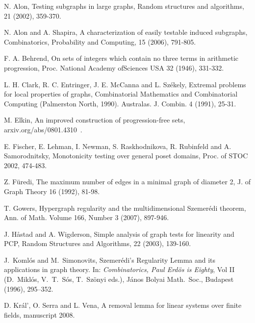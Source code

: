 \documentclass [letterpaper,11pt]{article}
\begin{document}

\begin{thebibliography}{99}

N. Alon, Testing subgraphs in large graphs, Random structures and
algorithms, 21 (2002), 359-370.

N. Alon and A. Shapira, A characterization of easily testable
induced subgraphs, Combinatorics, Probability and Computing, 15
(2006), 791-805.

F. A. Behrend, On sets of integers which contain no three terms in
arithmetic progression, Proc. National Academy ofSciences USA 32
(1946), 331-332.

L. H. Clark, R. C. Entringer, J. E. McCanna and L. Sz\'{e}kely,
Extremal problems for local properties of graphs, Combinatorial
Mathematics and Combinatorial Computing (Palmerston North, 1990).
Australas. J. Combin. 4 (1991), 25-31.

M. Elkin,
An improved construction of progression-free sets,
arxiv.org/abs/0801.4310~.

E. Fischer, E. Lehman, I. Newman, S. Raskhodnikova, R. Rubinfeld and
A. Samorodnitsky, Monotonicity testing over general poset domains,
Proc. of STOC 2002, 474-483.

Z. F\"{u}redi, The maximum number of edges in a minimal graph of
diameter 2, J. of Graph Theory 16 (1992), 81-98.

T. Gowers, Hypergraph regularity and the multidimensional
Szemer\'edi theorem, Ann. of Math. Volume 166, Number 3 (2007),
897-946.

J. H{\aa}stad and A. Wigderson, Simple analysis of graph tests for
linearity and PCP, Random Structures and Algorithms, 22 (2003),
139-160.

J.~Koml\'os and M.~Simonovits, Szemer\'edi's Regularity Lemma and
its applications in graph theory. In: {\em Combinatorics, Paul
Erd\"os is Eighty}, Vol II (D.~Mikl\'os, V.~T.~S\'os, T.~Sz\"onyi
eds.), J\'anos Bolyai Math.~Soc., Budapest (1996), 295--352.

D. Kr\'al', O. Serra and L. Vena, A removal lemma for linear systems
over finite fields, manuscript 2008.


\end{thebibliography}
\end{document}
